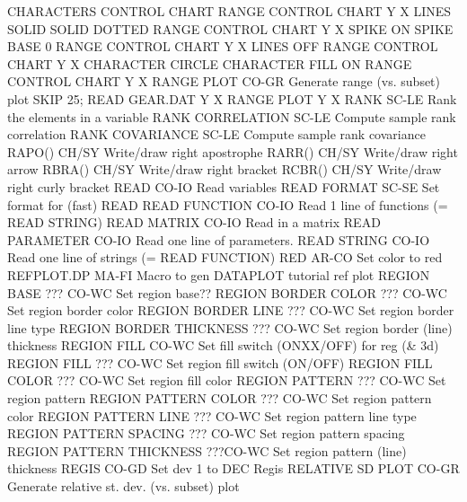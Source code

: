                                   CHARACTERS CONTROL CHART
                                  RANGE CONTROL CHART Y X
                                  LINES SOLID SOLID DOTTED
                                  RANGE CONTROL CHART Y X
                                  SPIKE ON
                                  SPIKE BASE 0
                                  RANGE CONTROL CHART Y X
                                  LINES OFF
                                  RANGE CONTROL CHART Y X
                                  CHARACTER CIRCLE
                                  CHARACTER FILL ON
                                  RANGE CONTROL CHART Y X
RANGE PLOT                  CO-GR Generate range (vs. subset) plot
                                  SKIP 25; READ GEAR.DAT Y X
                                  RANGE PLOT Y X
RANK                        SC-LE Rank the elements in a variable
RANK CORRELATION            SC-LE Compute sample rank correlation
RANK COVARIANCE             SC-LE Compute sample rank covariance
RAPO()                      CH/SY Write/draw right apostrophe
RARR()                      CH/SY Write/draw right arrow
RBRA()                      CH/SY Write/draw right bracket
RCBR()                      CH/SY Write/draw right curly bracket
READ                        CO-IO Read variables
READ FORMAT                 SC-SE Set format for (fast) READ
READ FUNCTION               CO-IO Read 1 line of functions (= READ STRING)
READ MATRIX                 CO-IO Read in a matrix
READ PARAMETER              CO-IO Read one line of parameters.
READ STRING                 CO-IO Read one line of strings (= READ FUNCTION)
RED                         AR-CO Set color to red
REFPLOT.DP                  MA-FI Macro to gen DATAPLOT tutorial ref plot
REGION BASE          ???    CO-WC Set region base??
REGION BORDER COLOR  ???    CO-WC Set region border color
REGION BORDER LINE   ???    CO-WC Set region border line type
REGION BORDER THICKNESS ??? CO-WC Set region border (line) thickness
REGION FILL                 CO-WC Set fill switch (ONXX/OFF) for reg (& 3d)
REGION FILL     ???         CO-WC Set region fill switch (ON/OFF)
REGION FILL COLOR    ???    CO-WC Set region fill color
REGION PATTERN       ???    CO-WC Set region pattern
REGION PATTERN COLOR ???    CO-WC Set region pattern color
REGION PATTERN LINE  ???    CO-WC Set region pattern line type
REGION PATTERN SPACING  ??? CO-WC Set region pattern spacing
REGION PATTERN THICKNESS ???CO-WC Set region pattern (line) thickness
REGIS                       CO-GD Set dev 1 to DEC Regis
RELATIVE SD PLOT            CO-GR Generate relative st. dev. (vs. subset) plot

